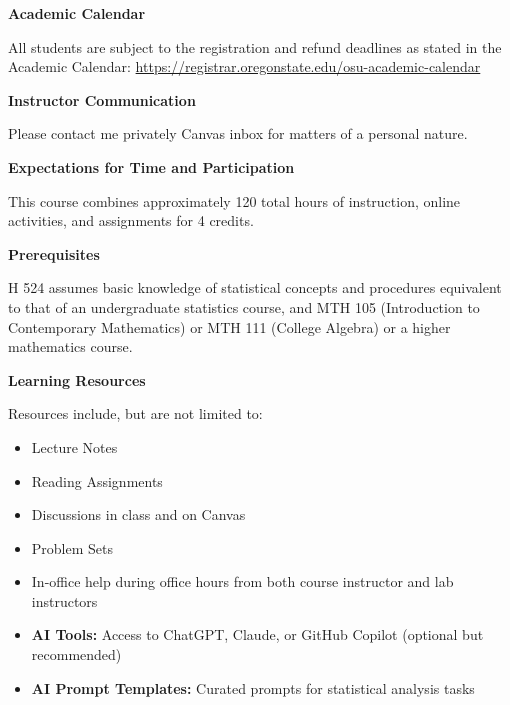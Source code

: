 \documentclass[11pt]{article}
\begin{document}
\vspace{8pt}

\noindent\textbf{Academic Calendar}

All students are subject to the registration and refund deadlines as stated in the Academic Calendar: \url{https://registrar.oregonstate.edu/osu-academic-calendar}

\vspace{8pt}

\noindent\textbf{Instructor Communication}

Please contact me privately Canvas inbox for matters of a personal nature.

\vspace{8pt}

\noindent\textbf{Expectations for Time and Participation}

This course combines approximately 120 total hours of instruction, online activities, and assignments for 4 credits.

\vspace{8pt}

\noindent\textbf{Prerequisites}

H 524 assumes basic knowledge of statistical concepts and procedures equivalent to that of an undergraduate statistics course, and MTH 105 (Introduction to Contemporary Mathematics) or MTH 111 (College Algebra) or a higher mathematics course.

\vspace{8pt}

\noindent\textbf{Learning Resources}

Resources include, but are not limited to:
\begin{itemize}[leftmargin=20pt]
\item Lecture Notes
\item Reading Assignments
\item Discussions in class and on Canvas
\item Problem Sets
\item In-office help during office hours from both course instructor and lab instructors
\item \textcolor{aiblue}{\textbf{AI Tools:}} Access to ChatGPT, Claude, or GitHub Copilot (optional but recommended)
\item \textcolor{aiblue}{\textbf{AI Prompt Templates:}} Curated prompts for statistical analysis tasks
\end{itemize}

\vspace{8pt}
\end{document}
